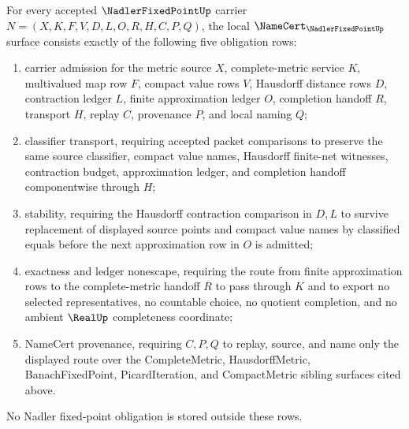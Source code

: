 \begin{theorem}\label{thm:nadler-fixed-point-namecert-obligations}
For every accepted $\NadlerFixedPointUp$ carrier $N=(X,K,F,V,D,L,O,R,H,C,P,Q)$, the local $\NameCert_{\NadlerFixedPointUp}$ surface consists exactly of the following five obligation rows:
\begin{enumerate}
\item carrier admission for the metric source $X$, complete-metric service $K$, multivalued map row $F$, compact value rows $V$, Hausdorff distance rows $D$, contraction ledger $L$, finite approximation ledger $O$, completion handoff $R$, transport $H$, replay $C$, provenance $P$, and local naming $Q$;
\item classifier transport, requiring accepted packet comparisons to preserve the same source classifier, compact value names, Hausdorff finite-net witnesses, contraction budget, approximation ledger, and completion handoff componentwise through $H$;
\item stability, requiring the Hausdorff contraction comparison in $D,L$ to survive replacement of displayed source points and compact value names by classified equals before the next approximation row in $O$ is admitted;
\item exactness and ledger nonescape, requiring the route from finite approximation rows to the complete-metric handoff $R$ to pass through $K$ and to export no selected representatives, no countable choice, no quotient completion, and no ambient $\RealUp$ completeness coordinate;
\item NameCert provenance, requiring $C,P,Q$ to replay, source, and name only the displayed route over the CompleteMetric, HausdorffMetric, BanachFixedPoint, PicardIteration, and CompactMetric sibling surfaces cited above.
\end{enumerate}
No Nadler fixed-point obligation is stored outside these rows.
\end{theorem}
